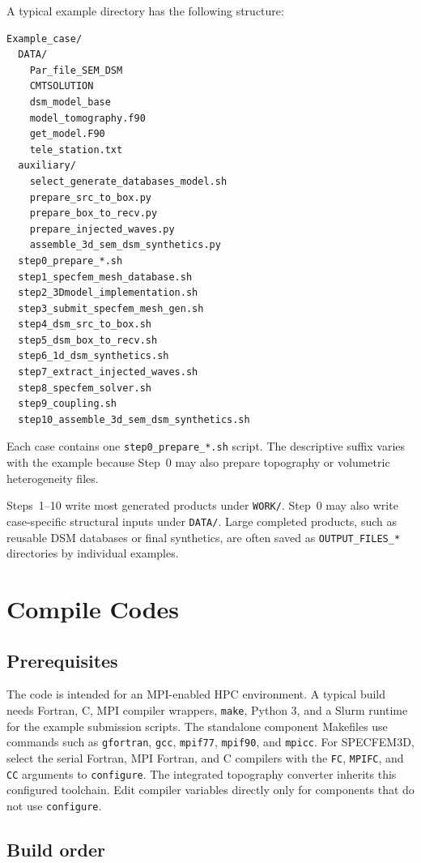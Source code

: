 \documentclass[11pt,oneside]{book}
\DeclareRobustCommand{\code}[1]{\nolinkurl{#1}}
\begin{document}
A typical example directory has the following structure:
\begin{lstlisting}
Example_case/
  DATA/
    Par_file_SEM_DSM
    CMTSOLUTION
    dsm_model_base
    model_tomography.f90
    get_model.F90
    tele_station.txt
  auxiliary/
    select_generate_databases_model.sh
    prepare_src_to_box.py
    prepare_box_to_recv.py
    prepare_injected_waves.py
    assemble_3d_sem_dsm_synthetics.py
  step0_prepare_*.sh
  step1_specfem_mesh_database.sh
  step2_3Dmodel_implementation.sh
  step3_submit_specfem_mesh_gen.sh
  step4_dsm_src_to_box.sh
  step5_dsm_box_to_recv.sh
  step6_1d_dsm_synthetics.sh
  step7_extract_injected_waves.sh
  step8_specfem_solver.sh
  step9_coupling.sh
  step10_assemble_3d_sem_dsm_synthetics.sh
\end{lstlisting}

Each case contains one \code{step0_prepare_*.sh} script. The descriptive
suffix varies with the example because Step~0 may also prepare topography or
volumetric heterogeneity files.

Steps~1--10 write most generated products under \code{WORK/}. Step~0 may
also write case-specific structural inputs under \code{DATA/}. Large completed
products, such as reusable DSM databases or final synthetics, are often saved
as \code{OUTPUT_FILES_*} directories by individual examples.

\chapter{Compile Codes}

\section{Prerequisites}

The code is intended for an MPI-enabled HPC environment. A typical build needs
Fortran, C, MPI compiler wrappers, \code{make}, Python 3, and a Slurm runtime
for the example submission scripts. The standalone component Makefiles use
commands such as \code{gfortran}, \code{gcc}, \code{mpif77}, \code{mpif90},
and \code{mpicc}. For SPECFEM3D, select the serial Fortran, MPI Fortran, and C
compilers with the \code{FC}, \code{MPIFC}, and \code{CC} arguments to
\code{configure}. The integrated topography converter inherits this configured
toolchain. Edit compiler variables directly only for components that do not use
\code{configure}.

\section{Build order}
\end{document}
